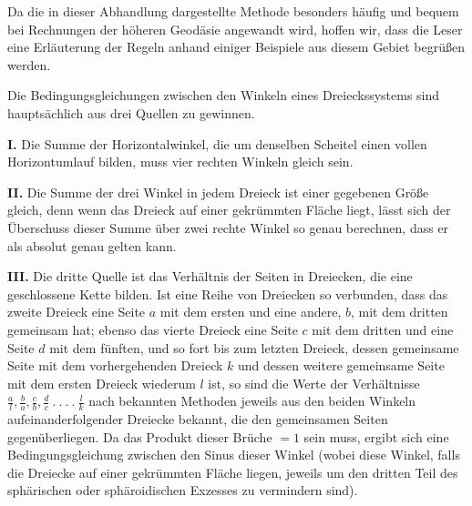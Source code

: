 Da die in dieser Abhandlung dargestellte Methode besonders häufig und bequem bei Rechnungen der höheren Geodäsie angewandt wird, hoffen wir, dass die Leser eine Erläuterung der Regeln anhand einiger Beispiele aus diesem Gebiet begrüßen werden.

Die Bedingungsgleichungen zwischen den Winkeln eines Dreieckssystems sind hauptsächlich aus drei Quellen zu gewinnen.

\par\noindent\textbf{I.} Die Summe der Horizontalwinkel, die um denselben Scheitel einen vollen Horizontumlauf bilden, muss vier rechten Winkeln gleich sein.

\par\noindent\textbf{II.} Die Summe der drei Winkel in jedem Dreieck ist einer gegebenen Größe gleich, denn wenn das Dreieck auf einer gekrümmten Fläche liegt, lässt sich der Überschuss dieser Summe über zwei rechte Winkel so genau berechnen, dass er als absolut genau gelten kann.

\par\noindent\textbf{III.} Die dritte Quelle ist das Verhältnis der Seiten in Dreiecken, die eine geschlossene Kette bilden. Ist eine Reihe von Dreiecken so verbunden, dass das zweite Dreieck eine Seite \(a\) mit dem ersten und eine andere, \(b\), mit dem dritten gemeinsam hat; ebenso das vierte Dreieck eine Seite \(c\) mit dem dritten und eine Seite \(d\) mit dem fünften, und so fort bis zum letzten Dreieck, dessen gemeinsame Seite mit dem vorhergehenden Dreieck \(k\) und dessen weitere gemeinsame Seite mit dem ersten Dreieck wiederum \(l\) ist, so sind die Werte der Verhältnisse \(\frac al,\allowbreak\frac ba,\allowbreak\frac cb,\allowbreak\frac dc\ .\ .\ .\ .\ \frac lk\) nach bekannten Methoden jeweils aus den beiden Winkeln aufeinanderfolgender Dreiecke bekannt, die den gemeinsamen Seiten gegenüberliegen. Da das Produkt dieser Brüche \(=1\) sein muss, ergibt sich eine Bedingungsgleichung zwischen den Sinus dieser Winkel (wobei diese Winkel, falls die Dreiecke auf einer gekrümmten Fläche liegen, jeweils um den dritten Teil des sphärischen oder sphäroidischen Exzesses zu vermindern sind).

